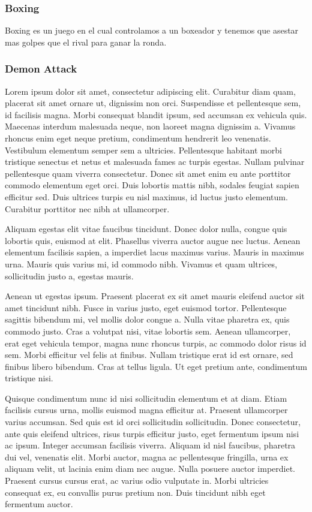 \subsubsection{Boxing}
\label{subsec:botsbasicos:boxing}
Boxing es un juego en el cual controlamos a un boxeador y tenemos que asestar mas golpes que el rival para ganar la ronda.



\subsubsection{Demon Attack}
\label{subsec:botsbasicos:da}
Lorem ipsum dolor sit amet, consectetur adipiscing elit. Curabitur diam quam, placerat sit amet ornare ut, dignissim non orci. Suspendisse et pellentesque sem, id facilisis magna. Morbi consequat blandit ipsum, sed accumsan ex vehicula quis. Maecenas interdum malesuada neque, non laoreet magna dignissim a. Vivamus rhoncus enim eget neque pretium, condimentum hendrerit leo venenatis. Vestibulum elementum semper sem a ultricies. Pellentesque habitant morbi tristique senectus et netus et malesuada fames ac turpis egestas. Nullam pulvinar pellentesque quam viverra consectetur. Donec sit amet enim eu ante porttitor commodo elementum eget orci. Duis lobortis mattis nibh, sodales feugiat sapien efficitur sed. Duis ultrices turpis eu nisl maximus, id luctus justo elementum. Curabitur porttitor nec nibh at ullamcorper.

Aliquam egestas elit vitae faucibus tincidunt. Donec dolor nulla, congue quis lobortis quis, euismod at elit. Phasellus viverra auctor augue nec luctus. Aenean elementum facilisis sapien, a imperdiet lacus maximus varius. Mauris in maximus urna. Mauris quis varius mi, id commodo nibh. Vivamus et quam ultrices, sollicitudin justo a, egestas mauris.

Aenean ut egestas ipsum. Praesent placerat ex sit amet mauris eleifend auctor sit amet tincidunt nibh. Fusce in varius justo, eget euismod tortor. Pellentesque sagittis bibendum mi, vel mollis dolor congue a. Nulla vitae pharetra ex, quis commodo justo. Cras a volutpat nisi, vitae lobortis sem. Aenean ullamcorper, erat eget vehicula tempor, magna nunc rhoncus turpis, ac commodo dolor risus id sem. Morbi efficitur vel felis at finibus. Nullam tristique erat id est ornare, sed finibus libero bibendum. Cras at tellus ligula. Ut eget pretium ante, condimentum tristique nisi.

Quisque condimentum nunc id nisi sollicitudin elementum et at diam. Etiam facilisis cursus urna, mollis euismod magna efficitur at. Praesent ullamcorper varius accumsan. Sed quis est id orci sollicitudin sollicitudin. Donec consectetur, ante quis eleifend ultrices, risus turpis efficitur justo, eget fermentum ipsum nisi ac ipsum. Integer accumsan facilisis viverra. Aliquam id nisl faucibus, pharetra dui vel, venenatis elit. Morbi auctor, magna ac pellentesque fringilla, urna ex aliquam velit, ut lacinia enim diam nec augue. Nulla posuere auctor imperdiet. Praesent cursus cursus erat, ac varius odio vulputate in. Morbi ultricies consequat ex, eu convallis purus pretium non. Duis tincidunt nibh eget fermentum auctor.



